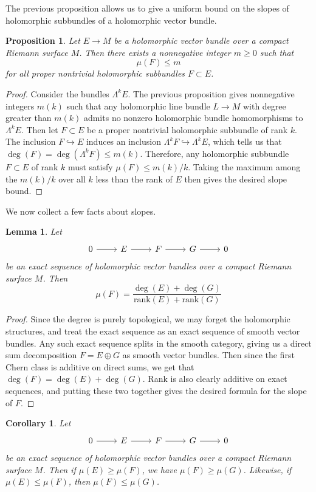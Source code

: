 \documentclass[psamsfonts, 12pt]{amsart}
\newtheorem{cor}[thm]{Corollary}
\newtheorem{prop}[thm]{Proposition}
\newtheorem{lem}[thm]{Lemma}
\theoremstyle{definition}
\theoremstyle{remark}
\begin{document}
%
The previous proposition allows us to give a uniform bound on the slopes of
holomorphic subbundles of a holomorphic vector bundle.
%
\begin{prop}
Let $E \to M$ be a holomorphic vector bundle over a compact Riemann surface $M$.
Then there exists a nonnegative integer $m \geq 0$ such that
\[
\mu(F) \leq m
\]
for all proper nontrivial holomorphic subbundles $F \subset E$.
\end{prop}
%
\begin{proof}
Consider the bundles $\Lambda^k E$. The previous proposition gives nonnegative
integers $m(k)$ such that any holomorphic line bundle $L \to M$ with degree
greater than $m(k)$ admits no nonzero holomorphic bundle homomorphisms to $\Lambda^kE$.
Then let $F \subset E$ be a proper nontrivial holomorphic subbundle of rank $k$.
The inclusion $F \hookrightarrow E$ induces an inclusion
$\Lambda^k F \hookrightarrow \Lambda^kE$, which tells us that
$\deg(F) = \deg(\Lambda^kF) \leq m(k)$. Therefore, any holomorphic subbundle
$F \subset E$ of rank $k$ must satisfy $\mu(F) \leq m(k)/k$. Taking the
maximum among the $m(k)/k$ over all $k$ less than the rank of $E$ then gives the
desired slope bound.
\end{proof}
%
We now collect a few facts about slopes.
%
\begin{lem}
Let
\[\begin{tikzcd}
0 \ar[r] & E \ar[r] & F \ar[r] & G \ar[r] & 0
\end{tikzcd}\]
be an exact sequence of holomorphic vector bundles over a compact Riemann surface
$M$. Then
\[
\mu(F) = \frac{\deg(E) + \deg(G)}{\mathrm{rank}(E) + \mathrm{rank}(G)}
\]
\end{lem}
%
\begin{proof}
Since the degree is purely topological, we may forget the holomorphic structures,
and treat the exact sequence as an exact sequence of smooth vector bundles.
Any such exact sequence splits in the smooth category, giving us a direct
sum decomposition $F = E \oplus G$ as smooth vector bundles. Then since the
first Chern class is additive on direct sums, we get that
$\deg(F) = \deg(E) + \deg(G)$. Rank is also clearly additive on exact sequences,
and putting these two together gives the desired formula for the slope of $F$.
\end{proof}
%
\begin{cor}
Let
\[\begin{tikzcd}
0 \ar[r] & E \ar[r] & F \ar[r] & G \ar[r] & 0
\end{tikzcd}\]
be an exact sequence of holomorphic vector bundles over a compact Riemann surface
$M$. Then if $\mu(E) \geq \mu(F)$, we have $\mu(F) \geq \mu(G)$. Likewise, if
$\mu(E) \leq \mu(F)$, then $\mu(F) \leq \mu(G)$.
\end{cor}
\end{document}
